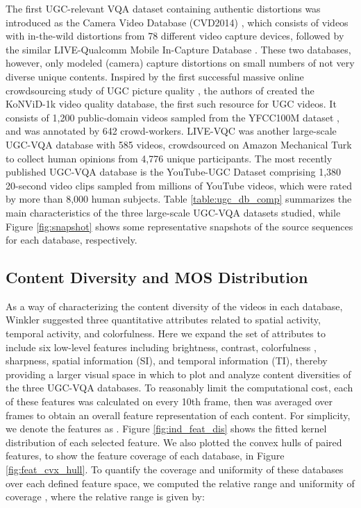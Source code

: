 \documentclass[journal]{IEEEtran}
\begin{document}
The first UGC-relevant VQA dataset containing authentic distortions was introduced as the Camera Video Database (CVD2014) \cite{nuutinen2016cvd2014}, which consists of videos with in-the-wild distortions from 78 different video capture devices, followed by the similar LIVE-Qualcomm Mobile In-Capture Database \cite{ghadiyaram2017capture}. These two databases, however, only modeled (camera) capture distortions on small numbers of not very diverse unique contents. Inspired by the first successful massive online crowdsourcing study of UGC picture quality \cite{ghadiyaram2015massive}, the authors of \cite{hosu2017konstanz} created the KoNViD-1k video quality database, the first such resource for UGC videos. It consists of 1,200 public-domain videos sampled from the YFCC100M dataset \cite{thomee2015yfcc100m}, and was annotated by 642 crowd-workers. LIVE-VQC \cite{sinno2018large} was another large-scale UGC-VQA database with 585 videos, crowdsourced on Amazon Mechanical Turk to collect human opinions from 4,776 unique participants. The most recently published UGC-VQA database is the YouTube-UGC Dataset \cite{wang2019youtube} comprising 1,380 20-second video clips sampled from millions of YouTube videos, which were rated by more than 8,000 human subjects. Table \ref{table:ugc_db_comp} summarizes the main characteristics of the three large-scale UGC-VQA datasets studied, while Figure \ref{fig:snapshot} shows some representative snapshots of the source sequences for each database, respectively.  


\subsection{Content Diversity and MOS Distribution}

As a way of characterizing the content diversity of the videos in each database, Winkler \cite{winkler2012analysis} suggested three quantitative attributes related to spatial activity, temporal activity, and colorfulness. Here we expand the set of attributes to include six low-level features including brightness, contrast, colorfulness \cite{hasler2003measuring}, sharpness, spatial information (SI), and temporal information (TI), thereby providing a larger visual space in which to plot and analyze content diversities of the three UGC-VQA databases. To reasonably limit the computational cost, each of these features was calculated on every 10th frame, then was averaged over frames to obtain an overall feature representation of each content. For simplicity, we denote the features as . Figure \ref{fig:ind_feat_dis} shows the fitted kernel distribution of each selected feature. We also plotted the convex hulls of paired features, to show the feature coverage of each database, in Figure \ref{fig:feat_cvx_hull}. To quantify the coverage and uniformity of these databases over each defined feature space, we computed the relative range and uniformity of coverage \cite{winkler2012analysis}, where the relative range is given by:
\end{document}
